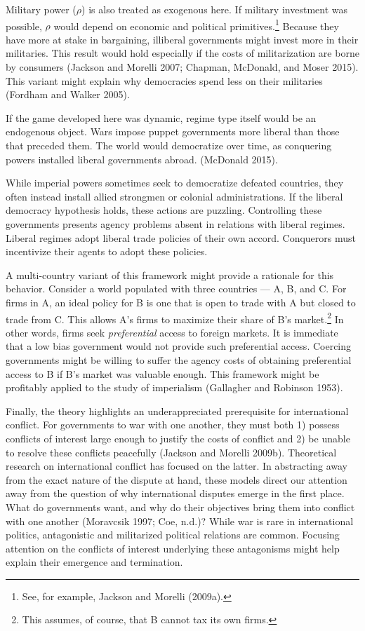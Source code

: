 \documentclass{puthesis}
\begin{document}
Military power (\(\rho\)) is also treated as exogenous here. If military
investment was possible, \(\rho\) would depend on economic and political
primitives.\footnote{See, for example, Jackson and Morelli (2009a).}
Because they have more at stake in bargaining, illiberal governments
might invest more in their militaries. This result would hold especially
if the costs of militarization are borne by consumers (Jackson and
Morelli 2007; Chapman, McDonald, and Moser 2015). This variant might
explain why democracies spend less on their militaries (Fordham and
Walker 2005).

If the game developed here was dynamic, regime type itself would be an
endogenous object. Wars impose puppet governments more liberal than
those that preceded them. The world would democratize over time, as
conquering powers installed liberal governments abroad. (McDonald 2015).

While imperial powers sometimes seek to democratize defeated countries,
they often instead install allied strongmen or colonial administrations.
If the liberal democracy hypothesis holds, these actions are puzzling.
Controlling these governments presents agency problems absent in
relations with liberal regimes. Liberal regimes adopt liberal trade
policies of their own accord. Conquerors must incentivize their agents
to adopt these policies.

A multi-country variant of this framework might provide a rationale for
this behavior. Consider a world populated with three countries --- A, B,
and C. For firms in A, an ideal policy for B is one that is open to
trade with A but closed to trade from C. This allows A's firms to
maximize their share of B's market.\footnote{This assumes, of course,
  that B cannot tax its own firms.} In other words, firms seek
\emph{preferential} access to foreign markets. It is immediate that a
low bias government would not provide such preferential access. Coercing
governments might be willing to suffer the agency costs of obtaining
preferential access to B if B's market was valuable enough. This
framework might be profitably applied to the study of imperialism
(Gallagher and Robinson 1953).

Finally, the theory highlights an underappreciated prerequisite for
international conflict. For governments to war with one another, they
must both 1) possess conflicts of interest large enough to justify the
costs of conflict and 2) be unable to resolve these conflicts peacefully
(Jackson and Morelli 2009b). Theoretical research on international
conflict has focused on the latter. In abstracting away from the exact
nature of the dispute at hand, these models direct our attention away
from the question of why international disputes emerge in the first
place. What do governments want, and why do their objectives bring them
into conflict with one another (Moravcsik 1997; Coe, n.d.)? While war is
rare in international politics, antagonistic and militarized political
relations are common. Focusing attention on the conflicts of interest
underlying these antagonisms might help explain their emergence and
termination.
\end{document}
